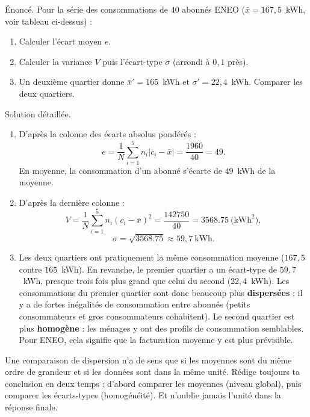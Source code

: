 \documentclass[11pt]{article}
\begin{document}
\begin{exoresolu}
Énoncé. Pour la série des consommations de $40$ abonnés ENEO ($\bar{x} = 167{,}5$~kWh, voir tableau ci-dessus) :
\begin{enumerate}
\item Calculer l'écart moyen $e$.
\item Calculer la variance $V$ puis l'écart-type $\sigma$ (arrondi à $0{,}1$ près).
\item Un deuxième quartier donne $\bar{x}' = 165$~kWh et $\sigma' = 22{,}4$~kWh. Comparer les deux quartiers.
\end{enumerate}
\tcblower
Solution détaillée.
\begin{enumerate}
\item D'après la colonne des écarts absolus pondérés :
\[ e = \frac{1}{N}\sum_{i=1}^{5} n_i|c_i - \bar{x}| = \frac{\num{1960}}{40} = 49. \]
En moyenne, la consommation d'un abonné s'écarte de $49$~kWh de la moyenne.
\item D'après la dernière colonne :
\[ V = \frac{1}{N}\sum_{i=1}^{5} n_i(c_i - \bar{x})^2 = \frac{\num{142750}}{40} = \num{3568,75} \ \text{(kWh}^2\text{)}, \]
\[ \sigma = \sqrt{\num{3568,75}} \approx 59{,}7 \ \text{kWh}. \]
\item Les deux quartiers ont pratiquement la même consommation moyenne ($167{,}5$ contre $165$~kWh). En revanche, le premier quartier a un écart-type de $59{,}7$~kWh, presque trois fois plus grand que celui du second ($22{,}4$~kWh). Les consommations du premier quartier sont donc beaucoup plus \textbf{dispersées} : il y a de fortes inégalités de consommation entre abonnés (petits consommateurs et gros consommateurs cohabitent). Le second quartier est plus \textbf{homogène} : les ménages y ont des profils de consommation semblables. Pour ENEO, cela signifie que la facturation moyenne y est plus prévisible.
\end{enumerate}
\end{exoresolu}

\begin{attention}
Une comparaison de dispersion n'a de sens que si les moyennes sont du même ordre de grandeur et si les données sont dans la même unité. Rédige toujours ta conclusion en deux temps : d'abord comparer les moyennes (niveau global), puis comparer les écarts-types (homogénéité). Et n'oublie jamais l'unité dans la réponse finale.
\end{attention}
\end{document}
